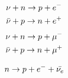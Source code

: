 \begin{equation}
    \begin{split}
    \nu + n \rightarrow p + e^- \\
    \Bar{\nu} + p \rightarrow n + e^+
    \label{test_e_decay}
    \end{split}
\end{equation}
\begin{equation}
    \begin{split}
    \nu + n \rightarrow p + \mu^-  \\
    \Bar{\nu} + p \rightarrow n + \mu^+
    \label{test_mu_decay}
    \end{split}
\end{equation}

\begin{equation}
    n \rightarrow p + e^- + \Bar{\nu_e} 
    \label{modern_beta_decay}
\end{equation}

